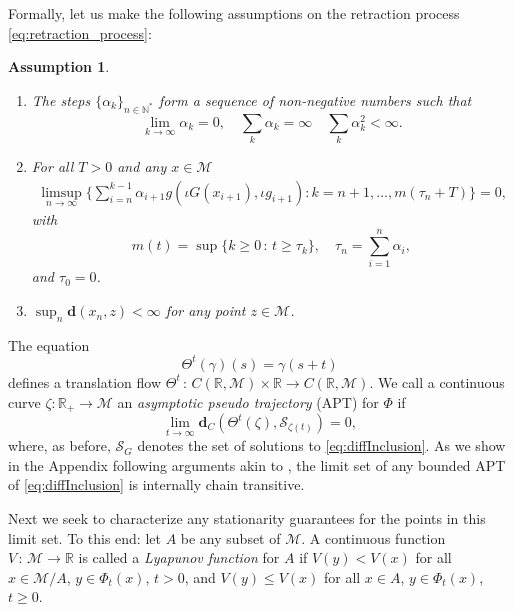 \documentclass{article}
\newtheorem{assumption}{Assumption}
\newcommand{\CM}{\mathcal{M}}
\newcommand{\BR}{\mathbb{R}}
\newcommand{\BN}{\mathbb{N}}
\newcommand{\bd}{\mathbf{d}}
\begin{document}
Formally, let us make the following assumptions on the retraction process \eqref{eq:retraction_process}:
\begin{assumption}\label{assumptionsincl}
    \begin{enumerate}
        \item The steps $\{\alpha_k\}_{n\in\BN^*}$ form a sequence of non-negative numbers such that
        \begin{equation}
            \lim_{k\to\infty}\alpha_k=0,\quad \sum_k\alpha_k=\infty\quad \sum_k\alpha_k^2<\infty.
        \end{equation}
    
        \item For all $T>0$ and any $x\in\CM$
        \begin{equation}
            \begin{aligned}
                \limsup_{n\to\infty}\Big\{ \sum_{i=n}^{k-1}\alpha_{i+1}g(\iota G(x_{i+1}),\iota g_{i+1}):k=n+1,\dots, m(\tau_n+T) \Big\}=0,
            \end{aligned}
        \end{equation}
        with 
        \begin{equation}
            m(t)=\sup\{k\geq 0\,:\,t\geq \tau_k\},\quad \tau_n=\sum_{i=1}^n\alpha_i,
        \end{equation}
        and $\tau_0=0$. 
        \item $\sup_n \bd(x_n,z)<\infty$ for any point $z\in\CM$. 
    \end{enumerate}
\end{assumption}


The equation
\begin{equation}
    \Theta^t(\gamma)(s)=\gamma(s+t)
\end{equation}
defines a translation flow $\Theta^t\,:\, C(\BR,\CM)\times\BR\to C(\BR,\CM)$. We call a continuous curve $\zeta:\BR_+\to\CM$ an \emph{asymptotic pseudo trajectory} (APT) for $\Phi$ if
\begin{equation}\label{eq:APTdef}
    \lim_{t\to\infty}\bd_C(\Theta^t(\zeta),\mathcal{S}_{\zeta(t)})=0,
\end{equation}
where, as before, $\mathcal{S}_G$ denotes the set of solutions to \eqref{eq:diffInclusion}. 
As we show in the Appendix following arguments akin to \cite{benaim2005stochastic}, the limit set of any bounded APT of \eqref{eq:diffInclusion} is internally chain transitive.

Next we seek to characterize any stationarity guarantees for the points in this limit set. To this end: let $A$ be any subset of $\CM$. A continuous function $V\,:\,\CM\to\BR$ is called a \emph{Lyapunov function} for $A$ if $V(y)<V(x)$ for all $x\in\CM/A$, $y\in \Phi_t(x)$, $t>0$, and $V(y)\leq V(x)$ for all $x\in A$, $y\in\Phi_t(x)$, $t\geq0$. 
\end{document}
